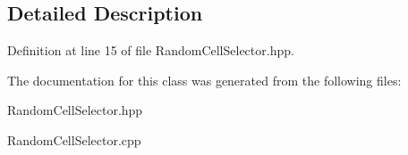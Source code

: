 \subsection{Detailed Description}


Definition at line 15 of file Random\-Cell\-Selector.\-hpp.



The documentation for this class was generated from the following files\-:\begin{DoxyCompactItemize}
\item 
Random\-Cell\-Selector.\-hpp\item 
Random\-Cell\-Selector.\-cpp\end{DoxyCompactItemize}
